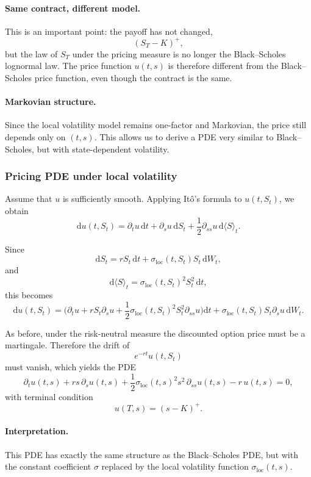 \documentclass[11pt]{article}
\theoremstyle{plain}
\theoremstyle{definition}
\theoremstyle{remark}
\begin{document}
\paragraph{Same contract, different model.}
This is an important point:
the payoff has not changed,
\[
(S_T-K)^+,
\]
but the law of \(S_T\) under the pricing measure is no longer the
Black--Scholes lognormal law.
The price function \(u(t,s)\) is therefore different from the
Black--Scholes price function, even though the contract is the same.

\paragraph{Markovian structure.}
Since the local volatility model remains one-factor and Markovian, the
price still depends only on \((t,s)\).
This allows us to derive a PDE very similar to Black--Scholes, but with
state-dependent volatility.

\subsubsection{Pricing PDE under local volatility}

Assume that \(u\) is sufficiently smooth.
Applying It\^o's formula to \(u(t,S_t)\), we obtain
\[
\mathrm{d}u(t,S_t)
=
\partial_t u\,\mathrm{d}t
+
\partial_s u\,\mathrm{d}S_t
+
\frac12 \partial_{ss}u\,\mathrm{d}\langle S\rangle_t.
\]

Since
\[
\mathrm{d}S_t
=
rS_t\,\mathrm{d}t
+
\sigma_{\mathrm{loc}}(t,S_t)S_t\,\mathrm{d}W_t,
\]
and
\[
\mathrm{d}\langle S\rangle_t
=
\sigma_{\mathrm{loc}}(t,S_t)^2S_t^2\,\mathrm{d}t,
\]
this becomes
\[
\mathrm{d}u(t,S_t)
=
\Big(
\partial_t u
+
rS_t\partial_s u
+
\frac12 \sigma_{\mathrm{loc}}(t,S_t)^2S_t^2\partial_{ss}u
\Big)\mathrm{d}t
+
\sigma_{\mathrm{loc}}(t,S_t)S_t\partial_s u\,\mathrm{d}W_t.
\]

As before, under the risk-neutral measure the discounted option price
must be a martingale.
Therefore the drift of
\[
e^{-rt}u(t,S_t)
\]
must vanish, which yields the PDE
\[
\boxed{
\partial_t u(t,s)
+
rs\,\partial_s u(t,s)
+
\frac12 \sigma_{\mathrm{loc}}(t,s)^2 s^2\,\partial_{ss}u(t,s)
-r\,u(t,s)
=
0,
}
\]
with terminal condition
\[
\boxed{
u(T,s)=(s-K)^+.
}
\]

\paragraph{Interpretation.}
This PDE has exactly the same structure as the Black--Scholes PDE, but
with the constant coefficient \(\sigma\) replaced by the local
volatility function \(\sigma_{\mathrm{loc}}(t,s)\).
\end{document}
